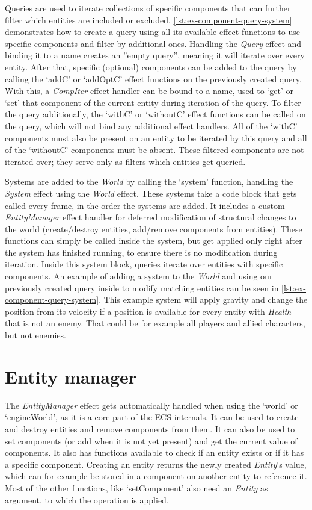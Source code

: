 Queries are used to iterate collections of specific components that can further filter which entities are included or excluded. \cref{lst:ex-component-query-system} demonstrates how to create a query using all its available effect functions to use specific components and filter by additional ones. Handling the \textit{Query} effect and binding it to a name creates an ''empty query'', meaning it will iterate over every entity. After that, specific (optional) components can be added to the query by calling the `addC' or `addOptC' effect functions on the previously created query. With this, a \textit{CompIter} effect handler can be bound to a name, used to `get' or `set' that component of the current entity during iteration of the query. To filter the query additionally, the `withC' or `withoutC' effect functions can be called on the query, which will not bind any additional effect handlers. All of the `withC' components must also be present on an entity to be iterated by this query and all of the `withoutC' components must be absent. These filtered components are not iterated over; they serve only as filters which entities get queried.

Systems are added to the \textit{World} by calling the `system' function, handling the \textit{System} effect using the \textit{World} effect. These systems take a code block that gets called every frame, in the order the systems are added. It includes a custom \textit{EntityManager} effect handler for deferred modification of structural changes to the world (create/destroy entities, add/remove components from entities). These functions can simply be called inside the system, but get applied only right after the system has finished running, to ensure there is no modification during iteration. Inside this system block, queries iterate over entities with specific components. An example of adding a system to the \textit{World} and using our previously created query inside to modify matching entities can be seen in \cref{lst:ex-component-query-system}. This example system will apply gravity and change the position from its velocity if a position is available for every entity with \textit{Health} that is not an enemy. That could be for example all players and allied characters, but not enemies.

\section{Entity manager}

The \textit{EntityManager} effect gets automatically handled when using the `world' or `engineWorld', as it is a core part of the ECS internals. It can be used to create and destroy entities and remove components from them. It can also be used to set components (or add when it is not yet present) and get the current value of components. It also has functions available to check if an entity exists or if it has a specific component. Creating an entity returns the newly created \textit{Entity}`s value, which can for example be stored in a component on another entity to reference it. Most of the other functions, like `setComponent' also need an \textit{Entity} as argument, to which the operation is applied.


